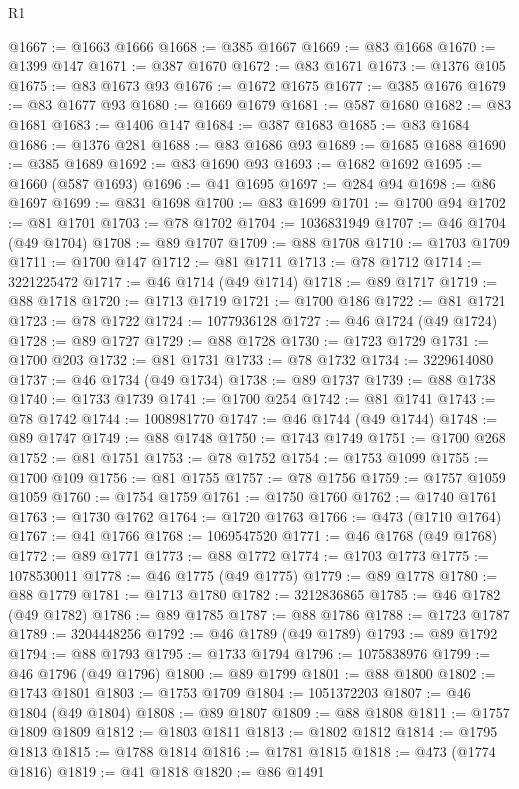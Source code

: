 \begin{lexlean}{R1}
\begin{coremodule}
@1667 := @1663 @1666
@1668 := @385 @1667
@1669 := @83 @1668
@1670 := @1399 @147
@1671 := @387 @1670
@1672 := @83 @1671
@1673 := @1376 @105
@1675 := @83 @1673 @93
@1676 := @1672 @1675
@1677 := @385 @1676
@1679 := @83 @1677 @93
@1680 := @1669 @1679
@1681 := @587 @1680
@1682 := @83 @1681
@1683 := @1406 @147
@1684 := @387 @1683
@1685 := @83 @1684
@1686 := @1376 @281
@1688 := @83 @1686 @93
@1689 := @1685 @1688
@1690 := @385 @1689
@1692 := @83 @1690 @93
@1693 := @1682 @1692
@1695 := @1660 (@587 @1693)
@1696 := @41 @1695
@1697 := @284 @94
@1698 := @86 @1697
@1699 := @831 @1698
@1700 := @83 @1699
@1701 := @1700 @94
@1702 := @81 @1701
@1703 := @78 @1702
@1704 := 1036831949
@1707 := @46 @1704 (@49 @1704)
@1708 := @89 @1707
@1709 := @88 @1708
@1710 := @1703 @1709
@1711 := @1700 @147
@1712 := @81 @1711
@1713 := @78 @1712
@1714 := 3221225472
@1717 := @46 @1714 (@49 @1714)
@1718 := @89 @1717
@1719 := @88 @1718
@1720 := @1713 @1719
@1721 := @1700 @186
@1722 := @81 @1721
@1723 := @78 @1722
@1724 := 1077936128
@1727 := @46 @1724 (@49 @1724)
@1728 := @89 @1727
@1729 := @88 @1728
@1730 := @1723 @1729
@1731 := @1700 @203
@1732 := @81 @1731
@1733 := @78 @1732
@1734 := 3229614080
@1737 := @46 @1734 (@49 @1734)
@1738 := @89 @1737
@1739 := @88 @1738
@1740 := @1733 @1739
@1741 := @1700 @254
@1742 := @81 @1741
@1743 := @78 @1742
@1744 := 1008981770
@1747 := @46 @1744 (@49 @1744)
@1748 := @89 @1747
@1749 := @88 @1748
@1750 := @1743 @1749
@1751 := @1700 @268
@1752 := @81 @1751
@1753 := @78 @1752
@1754 := @1753 @1099
@1755 := @1700 @109
@1756 := @81 @1755
@1757 := @78 @1756
@1759 := @1757 @1059 @1059
@1760 := @1754 @1759
@1761 := @1750 @1760
@1762 := @1740 @1761
@1763 := @1730 @1762
@1764 := @1720 @1763
@1766 := @473 (@1710 @1764)
@1767 := @41 @1766
@1768 := 1069547520
@1771 := @46 @1768 (@49 @1768)
@1772 := @89 @1771
@1773 := @88 @1772
@1774 := @1703 @1773
@1775 := 1078530011
@1778 := @46 @1775 (@49 @1775)
@1779 := @89 @1778
@1780 := @88 @1779
@1781 := @1713 @1780
@1782 := 3212836865
@1785 := @46 @1782 (@49 @1782)
@1786 := @89 @1785
@1787 := @88 @1786
@1788 := @1723 @1787
@1789 := 3204448256
@1792 := @46 @1789 (@49 @1789)
@1793 := @89 @1792
@1794 := @88 @1793
@1795 := @1733 @1794
@1796 := 1075838976
@1799 := @46 @1796 (@49 @1796)
@1800 := @89 @1799
@1801 := @88 @1800
@1802 := @1743 @1801
@1803 := @1753 @1709
@1804 := 1051372203
@1807 := @46 @1804 (@49 @1804)
@1808 := @89 @1807
@1809 := @88 @1808
@1811 := @1757 @1809 @1809
@1812 := @1803 @1811
@1813 := @1802 @1812
@1814 := @1795 @1813
@1815 := @1788 @1814
@1816 := @1781 @1815
@1818 := @473 (@1774 @1816)
@1819 := @41 @1818
@1820 := @86 @1491

\end{coremodule}
\end{lexlean}
